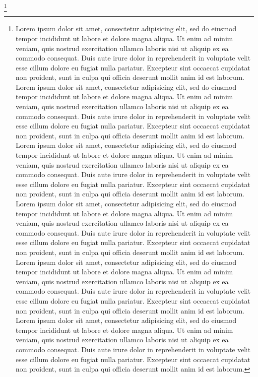 \documentclass[12pt]{article}
\begin{document}
\footnote{Lorem ipsum dolor sit amet, consectetur adipisicing elit, sed do eiusmod tempor incididunt ut labore et dolore magna aliqua. Ut enim ad minim veniam, quis nostrud exercitation ullamco laboris nisi ut aliquip ex ea commodo consequat. Duis aute irure dolor in reprehenderit in voluptate velit esse cillum dolore eu fugiat nulla pariatur. Excepteur sint occaecat cupidatat non proident, sunt in culpa qui officia deserunt mollit anim id est laborum. Lorem ipsum dolor sit amet, consectetur adipisicing elit, sed do eiusmod tempor incididunt ut labore et dolore magna aliqua. Ut enim ad minim veniam, quis nostrud exercitation ullamco laboris nisi ut aliquip ex ea commodo consequat. Duis aute irure dolor in reprehenderit in voluptate velit esse cillum dolore eu fugiat nulla pariatur. Excepteur sint occaecat cupidatat non proident, sunt in culpa qui officia deserunt mollit anim id est laborum. Lorem ipsum dolor sit amet, consectetur adipisicing elit, sed do eiusmod tempor incididunt ut labore et dolore magna aliqua. Ut enim ad minim veniam, quis nostrud exercitation ullamco laboris nisi ut aliquip ex ea commodo consequat. Duis aute irure dolor in reprehenderit in voluptate velit esse cillum dolore eu fugiat nulla pariatur. Excepteur sint occaecat cupidatat non proident, sunt in culpa qui officia deserunt mollit anim id est laborum. Lorem ipsum dolor sit amet, consectetur adipisicing elit, sed do eiusmod tempor incididunt ut labore et dolore magna aliqua. Ut enim ad minim veniam, quis nostrud exercitation ullamco laboris nisi ut aliquip ex ea commodo consequat. Duis aute irure dolor in reprehenderit in voluptate velit esse cillum dolore eu fugiat nulla pariatur. Excepteur sint occaecat cupidatat non proident, sunt in culpa qui officia deserunt mollit anim id est laborum. Lorem ipsum dolor sit amet, consectetur adipisicing elit, sed do eiusmod tempor incididunt ut labore et dolore magna aliqua. Ut enim ad minim veniam, quis nostrud exercitation ullamco laboris nisi ut aliquip ex ea commodo consequat. Duis aute irure dolor in reprehenderit in voluptate velit esse cillum dolore eu fugiat nulla pariatur. Excepteur sint occaecat cupidatat non proident, sunt in culpa qui officia deserunt mollit anim id est laborum. Lorem ipsum dolor sit amet, consectetur adipisicing elit, sed do eiusmod tempor incididunt ut labore et dolore magna aliqua. Ut enim ad minim veniam, quis nostrud exercitation ullamco laboris nisi ut aliquip ex ea commodo consequat. Duis aute irure dolor in reprehenderit in voluptate velit esse cillum dolore eu fugiat nulla pariatur. Excepteur sint occaecat cupidatat non proident, sunt in culpa qui officia deserunt mollit anim id est laborum.}

\nocite{*}
\newpage
\printbibliography[heading=bibintoc]
\end{document}
